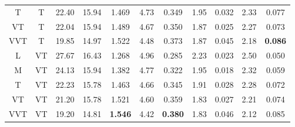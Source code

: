\begin{table}[htb]
\begin{center}
\begin{tabular}{|cc|c|cc|cc|cc|cc|}
T  & T & 22.40 & 15.94 & 1.469 & 4.73 & 0.349  & 1.95 & 0.032 & 2.33 & 0.077  \\  
VT & T & 22.04 & 15.94 & 1.489 & 4.67 & 0.350  & 1.87 & 0.025 & 2.27 & 0.073  \\  
VVT& T & 19.85 & 14.97 & 1.522 & 4.48 & 0.373  & 1.87 & 0.045 & 2.18 & \textbf{0.086}  \\  \hline
L  &VT & 27.67 & 16.43 & 1.268 & 4.96 & 0.285  & 2.23 & 0.023 & 2.50 & 0.050  \\  
M  &VT & 24.13 & 15.94 & 1.382 & 4.77 & 0.322  & 1.95 & 0.018 & 2.32 & 0.059  \\  
T  &VT & 22.23 & 15.78 & 1.463 & 4.66 & 0.345  & 1.91 & 0.028 & 2.28 & 0.072  \\  
VT &VT & 21.20 & 15.78 & 1.521 & 4.60 & 0.359  & 1.83 & 0.027 & 2.21 & 0.074  \\  
VVT&VT & 19.20 & 14.81 & \textbf{1.546} & 4.42 & \textbf{0.380}  & 1.83 & 0.046 & 2.12 & 0.085  \\ \hline
\end{tabular}
\end{center}
\end{table}


